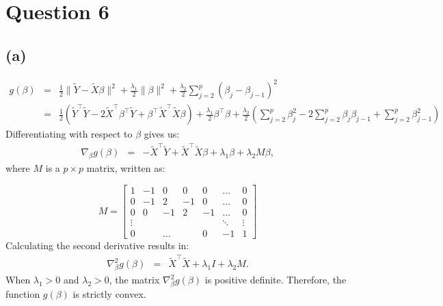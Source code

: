 \documentclass{article}\usepackage[]{graphicx}\usepackage[]{color}
\begin{document}
\section*{Question 6}
\subsection*{(a)}
\begin{eqnarray*}
  g(\beta) &=& \frac{1}{2}\|\tilde{Y}-\tilde{X}\beta\|^2 + \frac{\lambda_1}{2} \|\beta\|^2 + \frac{\lambda_2}{2} \sum_{j=2}^{p} \left( \beta_j - \beta_{j-1} \right)^2 \\
  &=& \frac{1}{2}\left(\tilde{Y}^\top\tilde{Y}-2\tilde{X}^\top\beta^\top\tilde{Y}+\beta^\top\tilde{X}^\top\tilde{X}\beta\right) + \frac{\lambda_1}{2} \beta^\top\beta + \frac{\lambda_2}{2} \left( \sum_{j=2}^p \beta_j^2 - 2\sum_{j=2}^p \beta_j\beta_{j-1} + \sum_{j=2}^p \beta_{j-1}^2  \right)
\end{eqnarray*}
Differentiating with respect to $\beta$ gives us:
\begin{eqnarray*}
  \nabla_\beta g(\beta) &=& -\tilde{X}^\top\tilde{Y} + \tilde{X}^\top\tilde{X}\beta + \lambda_1\beta + \lambda_2 M \beta,
\end{eqnarray*}
where $M$ is a $p \times p$ matrix, written as:

\[
M
=
\begin{bmatrix}
    1 & -1 & 0 & 0 & 0 & \dots & 0 \\
    0 & -1 & 2 & -1 & 0 & \dots  & 0 \\
    0 & 0 & -1 & 2 & -1 & \dots & 0 \\
    \vdots &  &  &  &  & \ddots & \vdots \\
    0 & & \dots &  & 0 & -1  & 1
\end{bmatrix}
\]
Calculating the second derivative results in:
\begin{eqnarray*}
  \nabla^2_\beta g(\beta) &=& \tilde{X}^\top\tilde{X} + \lambda_1 I + \lambda_2 M.
\end{eqnarray*}
When $\lambda_1>0$ and $\lambda_2>0$, the matrix $\nabla^2_\beta g(\beta)$ is positive definite.  Therefore, the function $g(\beta)$ is strictly convex.
\end{document}
